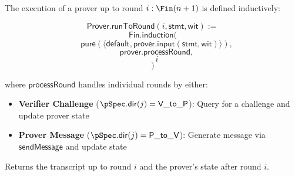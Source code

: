 \begin{definition}
    \label{def:prover_run_to_round}
    The execution of a prover up to round \(i : \Fin(n+1)\) is defined inductively:

    \begin{equation*} \mathsf{Prover}.\mathsf{runToRound}(i, \mathsf{stmt}, \mathsf{wit}) := \end{equation*}
    \begin{equation*} \mathsf{Fin}.\mathsf{induction}( \end{equation*}
    \begin{equation*} \quad \mathsf{pure}(\langle \mathsf{default}, \mathsf{prover}.\mathsf{input}(\mathsf{stmt}, \mathsf{wit}) \rangle), \end{equation*}
    \begin{equation*} \quad \mathsf{prover}.\mathsf{processRound}, \end{equation*}
    \begin{equation*} \quad i \end{equation*}
    \begin{equation*} ) \end{equation*}

    where \(\mathsf{processRound}\) handles individual rounds by either:
    \begin{itemize}
        \item \textbf{Verifier Challenge} (\(\pSpec.\mathsf{dir}(j) = \mathsf{V\_to\_P}\)): Query for a challenge and update prover state
        \item \textbf{Prover Message} (\(\pSpec.\mathsf{dir}(j) = \mathsf{P\_to\_V}\)): Generate message via \(\mathsf{sendMessage}\) and update state
    \end{itemize}

    Returns the transcript up to round \(i\) and the prover's state after round \(i\).
    \leanok
\end{definition}

